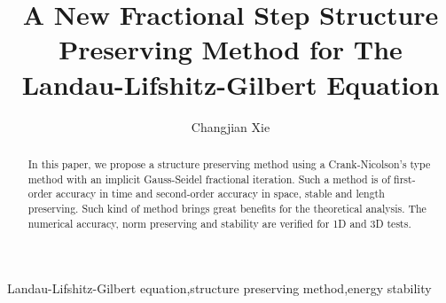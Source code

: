 \documentclass[preprint,times,3p]{elsarticle}
\begin{document}
\begin{frontmatter}

\title{A New Fractional Step Structure Preserving Method for The Landau-Lifshitz-Gilbert Equation}

\author[XJTLU]{Changjian Xie}



\address[XJTLU]{School of Mathematics and Physics, Xi'an-Jiaotong-Liverpool University, Re'ai Rd. 111, Suzhou, 215123, Jiangsu, China.}



\begin{abstract}
In this paper, we propose a structure preserving method using a Crank-Nicolson's type method with an implicit Gauss-Seidel fractional iteration. Such a method is of first-order accuracy in time and second-order accuracy in space, stable and length preserving. Such kind of method brings great benefits for the theoretical analysis. The numerical accuracy, norm preserving and stability are verified for 1D and 3D tests. 

\end{abstract}

\begin{keyword}
{Landau-Lifshitz-Gilbert equation\sep structure preserving method\sep energy stability}
\end{keyword}

\end{frontmatter}
\end{document}
